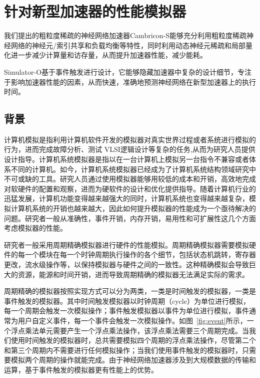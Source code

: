 \chapter{针对新型加速器的性能模拟器}

我们提出的粗粒度稀疏的神经网络加速器Cambricon-S能够充分利用粗粒度稀疏神经网络的神经元/索引共享和负载均衡等特性，同时利用动态神经元稀疏和局部量化进一步减少计算量和访存量，从而提升加速器性能，减少能耗。


Simulator-O基于事件触发进行设计，它能够隐藏加速器中复杂的设计细节，专注于影响加速器性能的因素，从而快速，准确地预测神经网络在新型加速器上的执行时间。


\section{背景}
计算机模拟是指利用计算机软件开发的模拟器对真实世界过程或者系统进行模拟的行为，进而完成故障分析、测试 VLSI逻辑设计等复杂的任务,从而为研究人员提供设计指导。计算机系统模拟器是指以在一台计算机上模拟另一台指令不兼容或者体系不同的计算机。如今，计算机系统模拟器已经成为了计算机系统结构领域研究中不可或缺的工具。研究人员通过使用模拟器能够用较低的成本和开销，高效地完成对软硬件的配置和观察，进而为硬软件的设计和优化提供指导。随着计算机行业的迅猛发展，计算机功能变得越来越强大的同时，计算机系统也变得越来越复杂，模拟计算机系统的开销也越来越大，因此如何提升模拟器的性能成为一个亟待解决的问题。研究者一般从准确性，事件开销，内存开销，易用性和可扩展性这几个方面考虑模拟器的性能。

研究者一般采用周期精确模拟器进行硬件的性能模拟。周期精确模拟器需要模拟硬件的每一个模块在每一个时钟周期执行操作的各个细节，包括状态机跳转，寄存器更改，流水级操作等，以保持模拟器与硬件之间的一致性。这种精确模拟会导致巨大的资源，能源和时间开销，进而导致周期精确的模拟器无法满足实际的需求。

周期精确的模拟器按照实现方式可以分为两类，一类是时间触发的模拟器，一类是事件触发的模拟器。其中时间触发模拟器以时钟周期（cycle）为单位进行模拟，每一个周期会触发一次模拟操作；事件触发模拟器以事件为单位进行模拟，事件通常为用户自定义事件，每一个事件会触发一次模拟操作。如图~\ref{fig:event}所示，一个浮点乘法单元需要产生一个浮点乘法操作，该浮点乘法需要三个周期完成。当我们使用时间触发的模拟器时，总共需要模拟四个周期的浮点乘法操作，尽管第二个和第三个周期内不需要进行任何模拟操作；当我们使用事件触发的模拟器时，只需要模拟两个周期的操作就能完成。由于神经网络加速器涉及到大规模数据的传输和运算，基于事件触发的模拟器更有性能上的优势。


